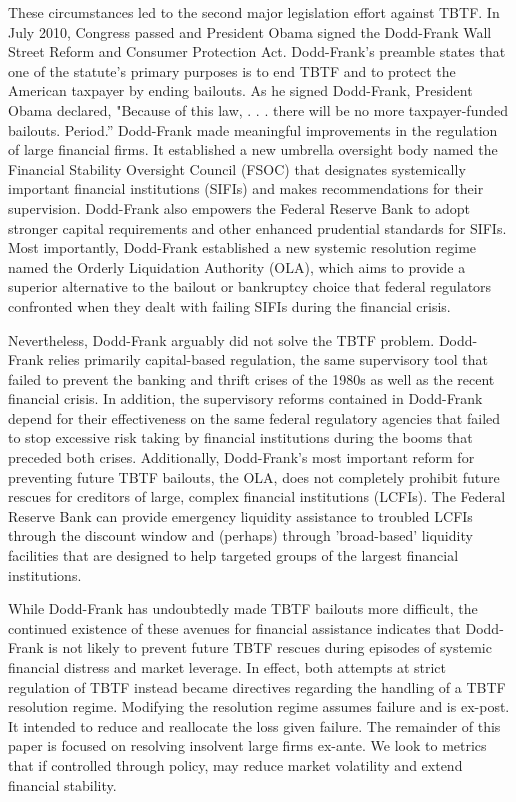 These circumstances led to the second major legislation effort against TBTF. In July 2010, Congress passed and President Obama signed the Dodd-Frank Wall Street Reform and Consumer Protection Act. Dodd-Frank's preamble states that one of the statute's primary purposes is to end TBTF and to protect the American taxpayer by ending bailouts. As he signed Dodd-Frank, President Obama declared, "Because of this law, . . . there will be no more taxpayer-funded bailouts. Period.''\cite{Frank}\cite{Wilmarth1} Dodd-Frank made meaningful improvements in the regulation of large financial firms.  It established a new umbrella oversight body named the Financial Stability Oversight Council (FSOC) that designates systemically important financial institutions (SIFIs) and makes recommendations for their supervision. Dodd-Frank also empowers the Federal Reserve Bank to adopt stronger capital requirements and other enhanced prudential standards for SIFIs. Most importantly, Dodd-Frank established a new systemic resolution regime named the Orderly Liquidation Authority (OLA), which aims to provide a superior alternative to the bailout or bankruptcy choice that federal regulators confronted when they dealt with failing SIFIs during the financial crisis.\cite{Wilmarth1}

Nevertheless, Dodd-Frank arguably did not solve the TBTF problem. Dodd-Frank relies primarily capital-based regulation, the same supervisory tool that failed to prevent the banking and thrift crises of the 1980s as well as the recent financial crisis. In addition, the supervisory reforms contained in Dodd-Frank depend for their effectiveness on the same federal regulatory agencies that failed to stop excessive risk taking by financial institutions during the booms that preceded both crises. Additionally, Dodd-Frank's most important reform for preventing future TBTF bailouts, the OLA, does not completely prohibit future rescues for creditors of large, complex financial institutions (LCFIs). The Federal Reserve Bank can provide emergency liquidity assistance to troubled LCFIs through the discount window and (perhaps) through 'broad-based' liquidity facilities that are designed to help targeted groups of the largest financial institutions.\cite{Wilmarth1}

While Dodd-Frank has undoubtedly made TBTF bailouts more difficult, the continued existence of these avenues for financial assistance indicates that Dodd-Frank is not likely to prevent future TBTF rescues during episodes of systemic financial distress and market leverage.  In effect, both attempts at strict regulation of TBTF instead became directives regarding the handling of a TBTF resolution regime.\cite{Kaufman}  Modifying the resolution regime assumes failure and is ex-post. It intended to reduce and reallocate the loss given failure. The remainder of this paper is focused on resolving insolvent large firms ex-ante.  We look to metrics that if controlled through policy, may reduce market volatility and extend financial stability. 


